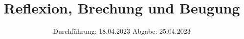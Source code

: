 

\subject{VERSUCH NUMMER 400}
\title{Reflexion, Brechung und Beugung}
\date{
  Durchführung: 18.04.2023
  \hspace{3em}
  Abgabe: 25.04.2023
}



\maketitle
\thispagestyle{empty}
\tableofcontents
\newpage
\setcounter{page}{1}








\newpage
\printbibliography
\nocite{ap308}
\nocite{matplotlib}
\nocite{numpy}
\nocite{scipy}
\nocite{uncertainties}
\nocite{reback2020pandas}

\newpage

%
%


